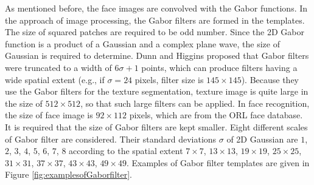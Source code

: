 As mentioned before, the face images are convolved with the Gabor functions. In the approach of image processing, the Gabor filters are formed in the templates. The size of squared patches are required to be odd number. Since the 2D Gabor function is a product of a Gaussian and a complex plane wave, the size of Gaussian is required to determine. Dunn and Higgins \cite{Dunn1995} proposed that Gabor filters were truncated to a width of $6\sigma+1$ points, which can produce filters having a wide spatial extent (e.g., if $\sigma = 24$ pixels, filter size is $145\times 145$). Because they use the Gabor filters for the texture segmentation, texture image is quite large in the size of $512\times 512$, so that such large filters can be applied. In face recognition, the size of face image is $92\times 112$ pixels, which are from the \mbox{ORL} face database. It is required that the size of Gabor filters are kept smaller. Eight different scales of Gabor filter are considered. Their standard deviations $\sigma$ of 2D Gaussian are $1$, $2$, $3$, $4$, $5$, $6$, $7$, $8$ according to the spatial extent $7\times 7$, $13\times 13$, $19\times 19$, $25\times 25$, $31\times 31$, $37\times 37$, $43\times 43$, $49\times 49$. Examples of Gabor filter templates are given in \mbox{Figure} \ref{fig:examplesofGaborfilter}.
